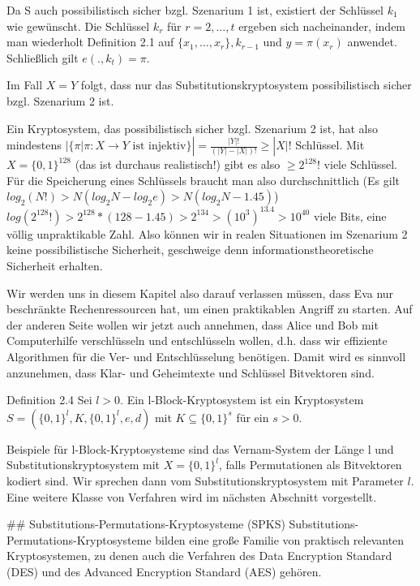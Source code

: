 \documentclass[a4paper]{article}
\begin{document}
\begin{multicols}{3}
Da S auch possibilistisch sicher bzgl. Szenarium 1 ist, existiert der Schlüssel $k_1$ wie gewünscht. Die Schlüssel $k_r$ für $r=2,...,t$ ergeben sich nacheinander, indem man wiederholt Definition 2.1 auf $\{x_1,...,x_r\},k_{r-1}$ und $y=\pi(x_r)$ anwendet. Schließlich gilt $e(.,k_t)=\pi$.

Im Fall $X=Y$ folgt, dass nur das Substitutionskryptosystem possibilistisch sicher bzgl. Szenarium 2 ist.

Ein Kryptosystem, das possibilistisch sicher bzgl. Szenarium 2 ist, hat also mindestens $|\{\pi |\pi :X\rightarrow Y\text{ ist injektiv}\}|=\frac{|Y|!}{(|Y|-|X|)!} \geq |X|!$ Schlüssel. Mit $X=\{0,1\}^{128}$  (das ist durchaus realistisch!) gibt es also $\geq 2^{128}!$ viele Schlüssel. Für die Speicherung eines Schlüssels braucht man also durchschnittlich (Es gilt $log_2(N!)>N(log_2 N-log_2 e)> N(log_2 N- 1.45)$) $log(2^{128}!)> 2^{128}*(128- 1.45)> 2^{134}>(10^3 )^{13.4} > 10^{40}$ viele Bits, eine völlig unpraktikable Zahl.
Also können wir in realen Situationen im Szenarium 2 keine possibilistische Sicherheit, geschweige denn informationstheoretische Sicherheit erhalten.

Wir werden uns in diesem Kapitel also darauf verlassen müssen, dass Eva nur beschränkte Rechenressourcen hat, um einen praktikablen Angriff zu starten. Auf der anderen Seite wollen wir jetzt auch annehmen, dass Alice und Bob mit Computerhilfe verschlüsseln und entschlüsseln wollen, d.h. dass wir effiziente Algorithmen für die Ver- und Entschlüsselung benötigen. Damit wird es sinnvoll anzunehmen, dass Klar- und Geheimtexte und Schlüssel Bitvektoren sind.

Definition 2.4 Sei $l>0$. Ein l-Block-Kryptosystem ist ein Kryptosystem $S=(\{0,1\}^l,K,\{0,1\}^l,e,d)$ mit $K\subseteq \{0,1\}^s$ für ein $s>0$.

Beispiele für l-Block-Kryptosysteme sind das Vernam-System der Länge l und Substitutionskryptosystem mit $X=\{0,1\}^l$, falls Permutationen als Bitvektoren kodiert sind. Wir sprechen dann vom Substitutionskryptosystem mit Parameter $l$.
Eine weitere Klasse von Verfahren wird im nächsten Abschnitt vorgestellt.

## Substitutions-Permutations-Kryptosysteme (SPKS)
Substitutions-Permutations-Kryptosysteme bilden eine große Familie von praktisch relevanten Kryptosystemen, zu denen auch die Verfahren des Data Encryption Standard (DES) und des Advanced Encryption Standard (AES) gehören.


\end{multicols}
\end{document}
